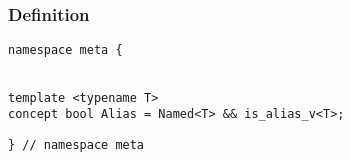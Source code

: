 
\subsubsection{Definition}

\begin{verbatim}
namespace meta {
\end{verbatim}
\begin{verbatim}

template <typename T>
concept bool Alias = Named<T> && is_alias_v<T>;

\end{verbatim}
\begin{verbatim}
} // namespace meta
\end{verbatim}
